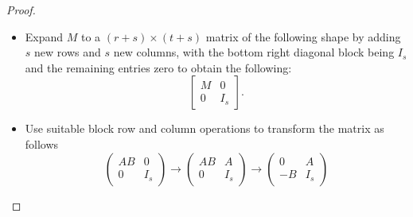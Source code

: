 \begin{proof}
\begin{itemize}
\item Expand $M$ to a $(r+s) \times (t+s)$ matrix of the following
  shape by adding $s$ new rows and $s$ new columns, with the bottom
  right diagonal block being $I_s$ and the remaining entries zero to
  obtain the following:
\[
\left[
\begin{array}{c|c}
M & 0 \\
\hline
0 & I_s
\end{array}
\right]. 
\]
\item Use suitable block row and column operations to transform the
  matrix as follows
\[
\left(
\begin{array}{cc}
AB & 0 \\
0 & I_s
\end{array}
\right)\rightarrow
\left(
\begin{array}{cc}
AB & A \\
0 & I_s
\end{array}
\right)\rightarrow
\left(
\begin{array}{cc}
0 & A \\
-B & I_s
\end{array}
\right)
\]


\end{itemize}
\end{proof}
